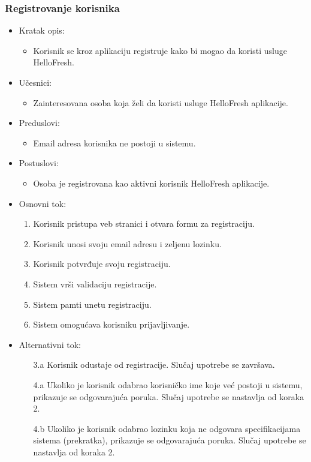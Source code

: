\subsubsection{Registrovanje korisnika}

\begin{itemize}
    \item Kratak opis:
        \begin{itemize}
            \item Korisnik se kroz aplikaciju registruje kako bi mogao da koristi usluge HelloFresh.
        \end{itemize}
    \item Učesnici:
        \begin{itemize}
            \item Zainteresovana osoba koja želi da koristi usluge HelloFresh aplikacije.
        \end{itemize}
    \item Preduslovi:
        \begin{itemize}
            \item Email adresa korisnika ne postoji u sistemu.
        \end{itemize}
    \item Postuslovi:
        \begin{itemize}
            \item Osoba je registrovana kao aktivni korisnik HelloFresh aplikacije.
        \end{itemize}
    \item Osnovni tok:
        \begin{enumerate}
            \item Korisnik pristupa veb stranici i otvara formu za registraciju.
            \item Korisnik unosi svoju email adresu i zeljenu lozinku.
            \item Korisnik potvrđuje svoju registraciju.
            \item Sistem vrši validaciju registracije.
            \item Sistem pamti unetu registraciju.
            \item Sistem omogućava korisniku prijavljivanje.
        \end{enumerate}
    \item Alternativni tok:
        \begin{itemize}
            \item[3.a] Korisnik odustaje od registracije. Slučaj upotrebe se završava.
            \item[4.a] Ukoliko je korisnik odabrao korisničko ime koje već postoji u sistemu, prikazuje se odgovarajuća poruka. Slučaj upotrebe se nastavlja od koraka 2.
            \item[4.b] Ukoliko je korisnik odabrao lozinku koja ne odgovara specifikacijama sistema (prekratka), prikazuje se odgovarajuća poruka. Slučaj upotrebe se nastavlja od koraka 2.
        \end{itemize}
\end{itemize}
